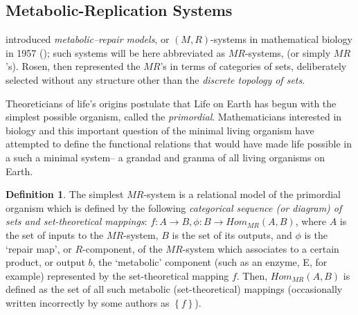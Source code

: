 \documentclass[12pt]{article}
\theoremstyle{plain}
\theoremstyle{definition}
\newtheorem{definition}{Definition}[section]
\numberwithin{equation}{section}
\begin{document}
\subsection{Metabolic-Replication Systems}

  introduced \emph{metabolic--repair models}, or $(M,R)$-systems in mathematical biology 
 in 1957 (\cite{RRosen1, RRosen2}); such systems will be here abbreviated as $MR$-systems, (or simply $MR$'s). Rosen, then represented the $MR$'s in terms of categories of sets, deliberately selected without any structure other than the {\em discrete topology of sets}.

Theoreticians of life's origins postulate that Life on Earth has begun with the simplest possible organism, called the \emph{primordial}. Mathematicians interested in biology and this important question of the minimal living organism have
attempted to define the functional relations that would have made life possible in a such a minimal system-- a grandad
and granma of all living organisms on Earth.   

\begin{definition}
The simplest $MR$-system is a relational model of the primordial organism which is defined by the following \emph{categorical sequence (or diagram) of sets and set-theoretical mappings}:
$f: A \rightarrow B, \phi: B \rightarrow Hom_{MR}(A,B)$, where $A$ is the set of inputs to the 
$MR$-system, $B$ is the set of its outputs, and $\phi$ is the `repair map', or $R$-component, of the $MR$-system which associates to a certain product, or output $b$, the `metabolic' component (such as an enzyme, E, for example)
represented by the set-theoretical mapping $f$. Then, $Hom_{MR}(A,B)$ is defined as the set of all such metabolic (set-theoretical) mappings (occasionally written incorrectly by some authors as $\left\{f\right\}$). 
\end{definition}
\end{document}
